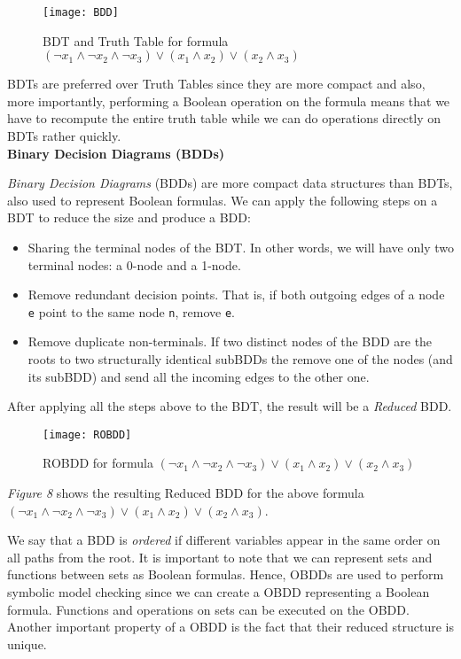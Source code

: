 \documentclass[../main.tex]{subfiles}
\begin{document}
\begin{figure}[ht]
\centering
\texttt{[image: BDD]}
\caption{BDT and Truth Table for formula $ (\neg x_1 \land \neg x_2 \land \neg x_3) \lor (x_1 \land  x_2) \lor(x_2 \land  x_3) $ \cite[]{BDD_fig}}
\end{figure}

BDTs are preferred over Truth Tables since they are more compact and also, more importantly, performing a Boolean operation on the formula means that we have to recompute the entire truth table while we can do operations directly on BDTs rather quickly.\\


\textbf{Binary Decision Diagrams (BDDs)}

\textit{Binary Decision Diagrams} (BDDs) are more compact data structures than BDTs, also used to represent Boolean formulas. We can apply the following steps on a BDT to reduce the size and produce a BDD:
\begin{itemize}
    \item Sharing the terminal nodes of the BDT. In other words, we will have only two terminal nodes: a 0-node and a 1-node.
    \item Remove redundant decision points. That is, if both outgoing edges of a node \verb|e| point to the same node \verb|n|, remove \verb|e|.
    \item Remove duplicate non-terminals. If two distinct nodes of the BDD are the roots to two structurally identical subBDDs the remove one of the nodes (and its subBDD) and send all the incoming edges to the other one.
\end{itemize}
After applying all the steps above to the BDT, the result will be a \textit{Reduced} BDD. 

\begin{figure}[ht]
\centering
\texttt{[image: ROBDD]}
\caption{ROBDD for formula $ (\neg x_1 \land \neg x_2 \land \neg x_3) \lor (x_1 \land  x_2) \lor(x_2 \land  x_3) $ \cite[]{ROBDD}}
\end{figure}


\textit{Figure 8} shows the resulting Reduced BDD for the above formula $ (\neg x_1 \land \neg x_2 \land \neg x_3) \lor (x_1 \land  x_2) \lor(x_2 \land  x_3) $.


We say that a BDD is \textit{ordered} if different variables appear in the same order on all paths from the root. It is important to note that we can represent sets and functions between sets as Boolean formulas. Hence, OBDDs are used to perform symbolic model checking since we can create a OBDD representing a Boolean formula. Functions and operations on sets can be executed on the OBDD. Another important property of a OBDD is the fact that their reduced structure is unique.\\
\end{document}
